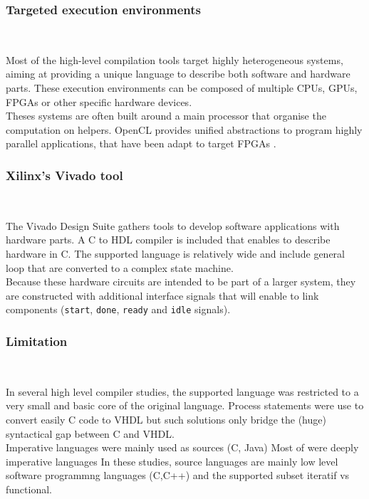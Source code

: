 \documentclass[10pt,a4paper]{article}
\newcommand{\code}{\texttt}
\renewcommand{\indent}{~\\\vspace{-.8cm}}
\begin{document}
\subsubsection{Targeted execution environments} \indent

Most of the high-level compilation tools target highly heterogeneous systems, aiming at providing a unique language to describe both software and hardware parts. These execution environments can be composed of multiple CPUs, GPUs, FPGAs or other specific hardware devices.\\

Theses systems are often built around a main processor that organise the computation on helpers. OpenCL provides unified abstractions to program highly parallel applications, that have been adapt to target FPGAs \cite{czajkowski2012opencl}.


\subsubsection{Xilinx's Vivado tool} \indent

The Vivado Design Suite gathers tools to develop software applications with hardware parts. A C to HDL compiler is included that enables to describe hardware in C. The supported language is relatively wide and include general loop that are converted to a complex state machine.\\

Because these hardware circuits are intended to be part of a larger system, they are constructed with additional interface signals that will enable to link components (\code {start}, \code {done}, \code {ready} and \code {idle} signals). 


\subsubsection{Limitation} \indent


In several high level compiler studies, the supported language was restricted to a very small and basic core of the original language. Process statements were use to convert easily C code to VHDL \cite{parkinson1994c} but such solutions only bridge the (huge) syntactical gap between C and VHDL.  \\

Imperative languages were mainly used as sources (C, Java)
Most of were deeply imperative languages
In these studies, source languages are mainly low level software programmng languages (C,C++) and the supported subset 
iteratif vs functional.
\end{document}
